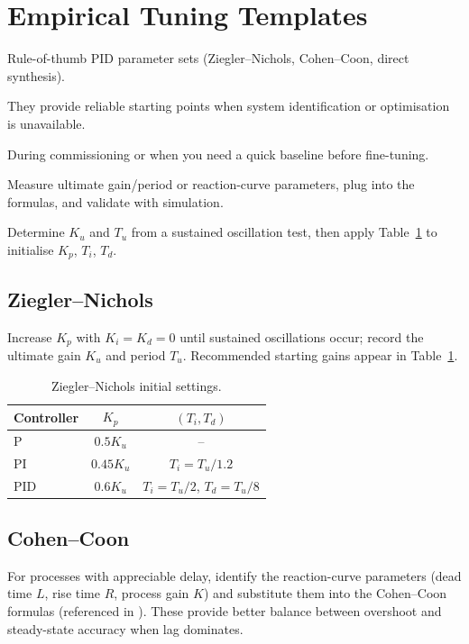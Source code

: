 \section{Empirical Tuning Templates}
\begin{beginnerguide}
    \item[\textbf{What?}] Rule-of-thumb PID parameter sets (Ziegler--Nichols, Cohen--Coon, direct synthesis).
    \item[\textbf{Why?}] They provide reliable starting points when system identification or optimisation is unavailable.
    \item[\textbf{When?}] During commissioning or when you need a quick baseline before fine-tuning.
    \item[\textbf{How?}] Measure ultimate gain/period or reaction-curve parameters, plug into the formulas, and validate with simulation.
    \item[\textbf{Example}] Determine $K_u$ and $T_u$ from a sustained oscillation test, then apply Table~\ref{tab:zn} to initialise $K_p$, $T_i$, $T_d$.
\end{beginnerguide}
\subsection{Ziegler--Nichols}
Increase $K_p$ with $K_i = K_d = 0$ until sustained oscillations occur; record the ultimate gain $K_u$ and period $T_u$. Recommended starting gains appear in Table~\ref{tab:zn}.
\begin{table}[h]
    \centering
    \begin{tabular}{lcc}
        \toprule
        Controller & $K_p$ & $(T_i, T_d)$ \\
        \midrule
        P   & $0.5 K_u$   & -- \\
        PI  & $0.45 K_u$  & $T_i = T_u/1.2$ \\
        PID & $0.6 K_u$   & $T_i = T_u/2$, $T_d = T_u/8$ \\
        \bottomrule
    \end{tabular}
    \caption{Ziegler--Nichols initial settings.}
    \label{tab:zn}
\end{table}

\subsection{Cohen--Coon}
For processes with appreciable delay, identify the reaction-curve parameters (dead time $L$, rise time $R$, process gain $K$) and substitute them into the Cohen--Coon formulas (referenced in \textcite{astrom1995pid}). These provide better balance between overshoot and steady-state accuracy when lag dominates.

